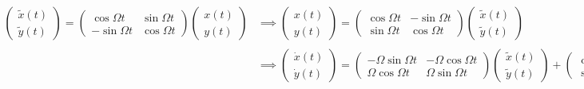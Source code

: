 \documentclass{article}
\theoremstyle{definition}
\begin{document}
\begin{align*}
	\begin{pmatrix}
		\tilde{x}(t) \\  \tilde{y}(t)
	\end{pmatrix}
	= 
	\begin{pmatrix}
		\cos \Omega t  & \sin\Omega t \\ -\sin\Omega t & \cos\Omega t 
	\end{pmatrix}
	\begin{pmatrix}
		x(t) \\ y(t)
	\end{pmatrix}
	&\implies 
	\begin{pmatrix}
		{x}(t) \\  {y}(t)
	\end{pmatrix}
	= 
	\begin{pmatrix}
		\cos \Omega t  & -\sin\Omega t \\ \sin\Omega t & \cos\Omega t 
	\end{pmatrix}
	\begin{pmatrix}
		\tilde{x}(t) \\ \tilde{y}(t)
	\end{pmatrix} \\
	& \implies
	\begin{pmatrix}
		\dot{x}(t) \\  \dot{y}(t)
	\end{pmatrix}
	= 
	\begin{pmatrix}
		-\Omega \sin \Omega t  & -\Omega \cos\Omega t \\ \Omega \cos\Omega t & \Omega \sin\Omega t 
	\end{pmatrix} \begin{pmatrix}
	\tilde{x}(t) \\ \tilde{y}(t)
\end{pmatrix}
	+ 
	\begin{pmatrix}
	\cos \Omega t  & -\sin\Omega t \\ \sin\Omega t & \cos\Omega t 
	\end{pmatrix}
	\begin{pmatrix}
	\dot{\tilde{x}}(t) \\ \dot{\tilde{y}}(t)
	\end{pmatrix}
\end{align*}
\end{document}
